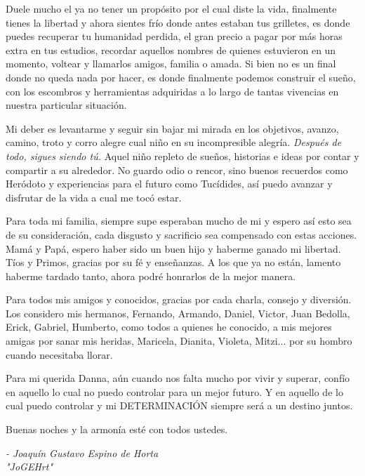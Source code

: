 \documentclass{book}
\begin{document}
	Duele mucho el ya no tener un propósito por el cual diste la vida, finalmente tienes la libertad y ahora sientes frío donde antes estaban tus grilletes, es donde puedes recuperar tu humanidad perdida, el gran precio a pagar por más horas extra en tus estudios, recordar aquellos nombres de quienes estuvieron en un momento, voltear y llamarlos amigos, familia o amada. Si bien no es un final donde no queda nada por hacer, es donde finalmente podemos construir el sueño, con los escombros y herramientas adquiridas a lo largo de tantas vivencias en nuestra particular situación.\par 
	
	Mi deber es levantarme y seguir sin bajar mi mirada en los objetivos, avanzo, camino, troto y corro alegre cual niño en su incompresible alegría. \emph{Después de todo, sigues siendo tú.} Aquel niño repleto de sueños, historias e ideas por contar y compartir a su alrededor. No guardo odio o rencor, sino buenos recuerdos como Heródoto y experiencias para el futuro como Tucídides, así puedo avanzar y disfrutar de la vida a cual me tocó estar.\par 
	
	Para toda mi familia, siempre supe esperaban mucho de mi y espero así esto sea de su consideración, cada disgusto y sacrificio sea compensado con estas acciones. Mamá y Papá, espero haber sido un buen hijo y haberme ganado mi libertad. Tíos y Primos, gracias por su fé y enseñanzas. A los que ya no están, lamento haberme tardado tanto, ahora podré honrarlos de la mejor manera.\par
	
	Para todos mis amigos y conocidos, gracias por cada charla, consejo y diversión. Los considero mis hermanos, Fernando, Armando, Daniel, Victor, Juan Bedolla, Erick, Gabriel, Humberto, como todos a quienes he conocido, a mis mejores amigas por sanar mis heridas, Maricela, Dianita, Violeta, Mitzi... por su hombro cuando necesitaba llorar.\par
	
	Para mi querida Danna, aún cuando nos falta mucho por vivir y superar, confío en aquello lo cual no puedo controlar para un mejor futuro. Y en aquello de lo cual puedo controlar y mi DETERMINACIÓN siempre será a un destino juntos.\par
	
	Buenas noches y la armonía esté con todos ustedes.\par
	
	\begin{flushright}\emph{- Joaquín Gustavo Espino de Horta}\\ \emph{"JoGEHrt"}\end{flushright}
	
\end{document}
